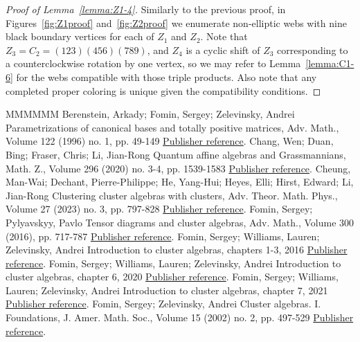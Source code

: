 \documentclass[11pt]{article}
\theoremstyle{definition}
\numberwithin{equation}{section}
\numberwithin{equation}{section}
\begin{document}
\begin{proof}[Proof of Lemma~\ref{lemma:Z1-4}]
Similarly to the previous proof, in Figures~\ref{fig:Z1proof} and~\ref{fig:Z2proof} we enumerate non-elliptic webs with nine black boundary vertices for each of $Z_1$ and $Z_2$. Note that $Z_3=C_2=(123)(456)(789)$, and $Z_4$ is a cyclic shift of $Z_3$ corresponding to a counterclockwise rotation by one vertex, so we may refer to Lemma~\ref{lemma:C1-6} for the webs compatible with those triple products. Also note that any completed proper coloring is unique given the compatibility conditions.
\end{proof}
\begin{thebibliography}{MMMMMM}
 Berenstein, Arkady; Fomin, Sergey; Zelevinsky, Andrei Parametrizations of canonical bases and totally positive matrices, Adv. Math., Volume 122 (1996) no. 1, pp. 49-149 \href{https://alco.centre-mersenne.org/articles/10.5802/alco.376/#bfz96}{Publisher reference}.
 Chang, Wen; Duan, Bing; Fraser, Chris; Li, Jian-Rong Quantum affine algebras and Grassmannians, Math. Z., Volume 296 (2020) no. 3-4, pp. 1539-1583 \href{https://alco.centre-mersenne.org/articles/10.5802/alco.376/#quantum20}{Publisher reference}.
 Cheung, Man-Wai; Dechant, Pierre-Philippe; He, Yang-Hui; Heyes, Elli; Hirst, Edward; Li, Jian-Rong Clustering cluster algebras with clusters, Adv. Theor. Math. Phys., Volume 27 (2023) no. 3, pp. 797-828 \href{https://alco.centre-mersenne.org/articles/10.5802/alco.376/#clustering}{Publisher reference}.
 Fomin, Sergey; Pylyavskyy, Pavlo Tensor diagrams and cluster algebras, Adv. Math., Volume 300 (2016), pp. 717-787 \href{https://alco.centre-mersenne.org/articles/10.5802/alco.376/#fominpasha2016}{Publisher reference}.
 Fomin, Sergey; Williams, Lauren; Zelevinsky, Andrei Introduction to cluster algebras, chapters 1-3, 2016 \href{https://alco.centre-mersenne.org/articles/10.5802/alco.376/#fwz-ch1-3}{Publisher reference}.
 Fomin, Sergey; Williams, Lauren; Zelevinsky, Andrei Introduction to cluster algebras, chapter 6, 2020 \href{https://alco.centre-mersenne.org/articles/10.5802/alco.376/#fwz-ch6}{Publisher reference}.
 Fomin, Sergey; Williams, Lauren; Zelevinsky, Andrei Introduction to cluster algebras, chapter 7, 2021 \href{https://alco.centre-mersenne.org/articles/10.5802/alco.376/#fwz-ch7}{Publisher reference}.
 Fomin, Sergey; Zelevinsky, Andrei Cluster algebras. I. Foundations, J. Amer. Math. Soc., Volume 15 (2002) no. 2, pp. 497-529 \href{https://alco.centre-mersenne.org/articles/10.5802/alco.376/#fz02}{Publisher reference}.

\end{thebibliography}
\end{document}
